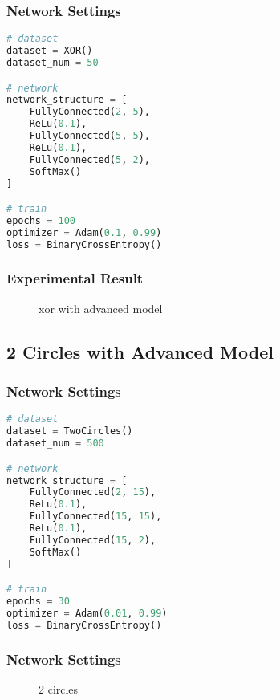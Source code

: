 \subsubsection{Network Settings}
\begin{lstlisting}[language=Python]
# dataset
dataset = XOR()
dataset_num = 50

# network
network_structure = [
    FullyConnected(2, 5),
    ReLu(0.1),
    FullyConnected(5, 5),
    ReLu(0.1),
    FullyConnected(5, 2),
    SoftMax()
]

# train
epochs = 100
optimizer = Adam(0.1, 0.99)
loss = BinaryCrossEntropy()
\end{lstlisting}

\subsubsection{Experimental Result}
\begin{figure}[!ht]
    \centering
    \qquad
    \qquad
    \qquad
    \caption{xor with advanced model}
\end{figure}

\newpage
\subsection{2 Circles with Advanced Model}
\subsubsection{Network Settings}
\begin{lstlisting}[language=Python]
# dataset
dataset = TwoCircles()
dataset_num = 500

# network
network_structure = [
    FullyConnected(2, 15),
    ReLu(0.1),
    FullyConnected(15, 15),
    ReLu(0.1),
    FullyConnected(15, 2),
    SoftMax()
]

# train
epochs = 30
optimizer = Adam(0.01, 0.99)
loss = BinaryCrossEntropy()
\end{lstlisting}

\subsubsection{Network Settings}
\begin{figure}[!ht]
    \centering
    \qquad
    \qquad
    \qquad
    \caption{2 circles}
\end{figure}

